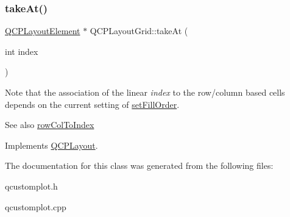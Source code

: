 \mbox{\label{class_q_c_p_layout_grid_a17dd220234d1bbf8835abcc666384d45}} 
\subsubsection{\texorpdfstring{take\+At()}{takeAt()}}
{\footnotesize\ttfamily \hyperlink{class_q_c_p_layout_element}{Q\+C\+P\+Layout\+Element} $\ast$ Q\+C\+P\+Layout\+Grid\+::take\+At (\begin{DoxyParamCaption}\item[{int}]{index }\end{DoxyParamCaption})\hspace{0.3cm}{\ttfamily [virtual]}}

Note that the association of the linear {\itshape index} to the row/column based cells depends on the current setting of \hyperlink{class_q_c_p_layout_grid_affc2f3cfd22f28698c5b29b960d2a391}{set\+Fill\+Order}.

\begin{DoxySeeAlso}{See also}
\hyperlink{class_q_c_p_layout_grid_a682ba76f130810ffd294032a1bfbcfcb}{row\+Col\+To\+Index} 
\end{DoxySeeAlso}


Implements \hyperlink{class_q_c_p_layout_a5a79621fa0a6eabb8b520cfc04fb601a}{Q\+C\+P\+Layout}.



The documentation for this class was generated from the following files\+:\begin{DoxyCompactItemize}
\item 
qcustomplot.\+h\item 
qcustomplot.\+cpp\end{DoxyCompactItemize}
